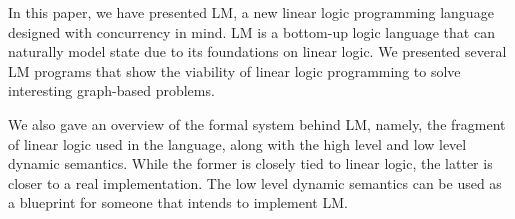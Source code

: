 In this paper, we have presented LM, a new linear logic programming language designed with concurrency in mind. LM is a bottom-up logic language
that can naturally model state due to its foundations on linear logic.
We presented several LM programs that show the viability of linear logic programming to solve interesting graph-based problems.

We also gave an overview of the formal system behind LM, namely, the fragment of linear logic used in the language, along with the high level and low level dynamic semantics.
While the former is closely tied to linear logic, the latter is closer to a real implementation. The low level dynamic semantics can be used as a blueprint for someone that
intends to implement LM.
